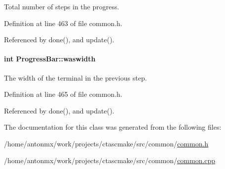 Total number of steps in the progress. 



Definition at line 463 of file common.h.



Referenced by done(), and update().

\hypertarget{classProgressBar_a95c47a5a15f9fad58f92ce62ac4cc163}{
\paragraph[{waswidth}]{\setlength{\rightskip}{0pt plus 5cm}int {\bf ProgressBar::waswidth}}\hfill}
\label{classProgressBar_a95c47a5a15f9fad58f92ce62ac4cc163}


The width of the terminal in the previous step. 



Definition at line 465 of file common.h.



Referenced by done(), and update().



The documentation for this class was generated from the following files:\begin{DoxyCompactItemize}
\item 
/home/antonmx/work/projects/ctascmake/src/common/\hyperlink{common_8h}{common.h}\item 
/home/antonmx/work/projects/ctascmake/src/common/\hyperlink{common_8cpp}{common.cpp}\end{DoxyCompactItemize}
